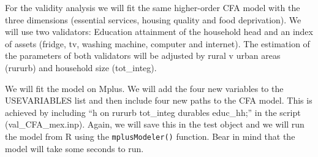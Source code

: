 \documentclass[]{book}
\begin{document}
For the validity analysis we will fit the same higher-order CFA model with the three dimensions (essential services, housing quality and food deprivation). We will use two validators: Education attainment of the household head and an index of assets (fridge, tv, washing machine, computer and internet). The estimation of the parameters of both validators will be adjusted by rural v urban areas (rururb) and household size (tot\_integ).

We will fit the model on Mplus. We will add the four new variables to the USEVARIABLES list and then include four new paths to the CFA model. This is achieved by including ``h on rururb tot\_integ durables educ\_hh;'' in the script (val\_CFA\_mex.inp). Again, we will save this in the test object and we will run the model from R using the \texttt{mplusModeler()} function. Bear in mind that the model will take some seconds to run.
\end{document}
